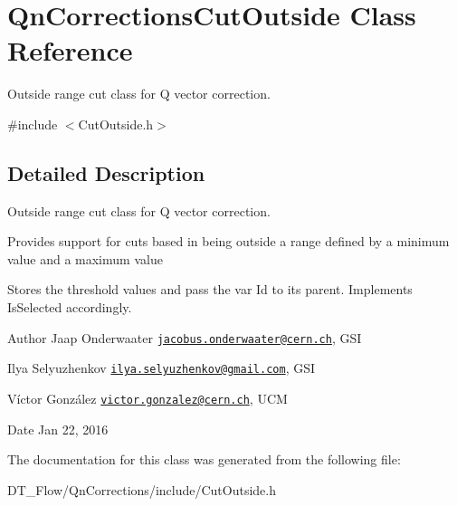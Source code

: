 \hypertarget{classQnCorrectionsCutOutside}{}\section{Qn\+Corrections\+Cut\+Outside Class Reference}
\label{classQnCorrectionsCutOutside}


Outside range cut class for Q vector correction.  




{\ttfamily \#include $<$Cut\+Outside.\+h$>$}



\subsection{Detailed Description}
Outside range cut class for Q vector correction. 

Provides support for cuts based in being outside a range defined by a minimum value and a maximum value

Stores the threshold values and pass the var Id to its parent. Implements Is\+Selected accordingly.

\begin{DoxyAuthor}{Author}
Jaap Onderwaater \href{mailto:jacobus.onderwaater@cern.ch}{\tt jacobus.\+onderwaater@cern.\+ch}, G\+SI 

Ilya Selyuzhenkov \href{mailto:ilya.selyuzhenkov@gmail.com}{\tt ilya.\+selyuzhenkov@gmail.\+com}, G\+SI 

Víctor González \href{mailto:victor.gonzalez@cern.ch}{\tt victor.\+gonzalez@cern.\+ch}, U\+CM 
\end{DoxyAuthor}
\begin{DoxyDate}{Date}
Jan 22, 2016 
\end{DoxyDate}


The documentation for this class was generated from the following file\+:\begin{DoxyCompactItemize}
\item 
D\+T\+\_\+\+Flow/\+Qn\+Corrections/include/Cut\+Outside.\+h\end{DoxyCompactItemize}
